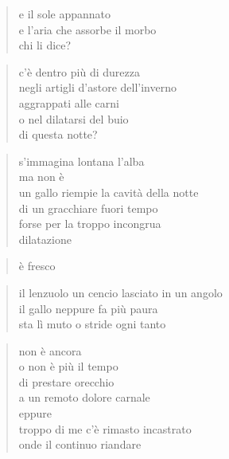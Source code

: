 \begin{verse}
    e il sole appannato\\
    e l'aria che assorbe il morbo\\
    chi li dice?
\end{verse}

\clearpage


\begin{verse}
    c'è dentro più di durezza\\
    negli artigli d'astore dell'inverno\\
    aggrappati alle carni\\
    o nel dilatarsi del buio\\
    di questa notte?
\end{verse}

\begin{verse}
    s'immagina lontana l'alba\\
    ma non è\\
    un gallo riempie la cavità della notte\\
    di un gracchiare fuori tempo\\
    forse per la troppo incongrua\\
    dilatazione
\end{verse}

\begin{verse}
    è fresco
\end{verse}

\begin{verse}
    il lenzuolo un cencio lasciato in un angolo\\
    il gallo neppure fa più paura\\
    sta lì muto o stride ogni tanto
\end{verse}

\clearpage


\begin{verse}
    non è ancora\\
    o non è più il tempo\\
    di prestare orecchio\\
    a un remoto dolore carnale\\
    eppure\\
    troppo di me c'è rimasto incastrato\\
    onde il continuo riandare
\end{verse}

\clearpage

